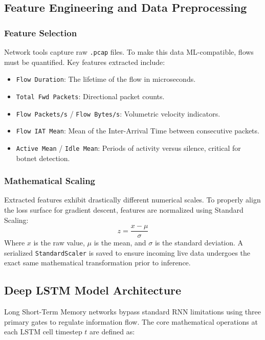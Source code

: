 \documentclass[conference]{IEEEtran}
\begin{document}
\subsection{Feature Engineering and Data Preprocessing}

\subsubsection{Feature Selection}
Network tools capture raw \texttt{.pcap} files. To make this data ML-compatible, flows must be quantified. Key features extracted include:
\begin{itemize}
    \item \texttt{Flow Duration}: The lifetime of the flow in microseconds.
    \item \texttt{Total Fwd Packets}: Directional packet counts.
    \item \texttt{Flow Packets/s} / \texttt{Flow Bytes/s}: Volumetric velocity indicators.
    \item \texttt{Flow IAT Mean}: Mean of the Inter-Arrival Time between consecutive packets.
    \item \texttt{Active Mean} / \texttt{Idle Mean}: Periods of activity versus silence, critical for botnet detection.
\end{itemize}

\subsubsection{Mathematical Scaling}
Extracted features exhibit drastically different numerical scales. To properly align the loss surface for gradient descent, features are normalized using Standard Scaling:
\begin{equation}
z = \frac{x - \mu}{\sigma}
\end{equation}
Where $x$ is the raw value, $\mu$ is the mean, and $\sigma$ is the standard deviation. A serialized \texttt{StandardScaler} is saved to ensure incoming live data undergoes the exact same mathematical transformation prior to inference. 

\subsection{Deep LSTM Model Architecture}

Long Short-Term Memory networks bypass standard RNN limitations using three primary gates to regulate information flow. The core mathematical operations at each LSTM cell timestep $t$ are defined as:
\end{document}

